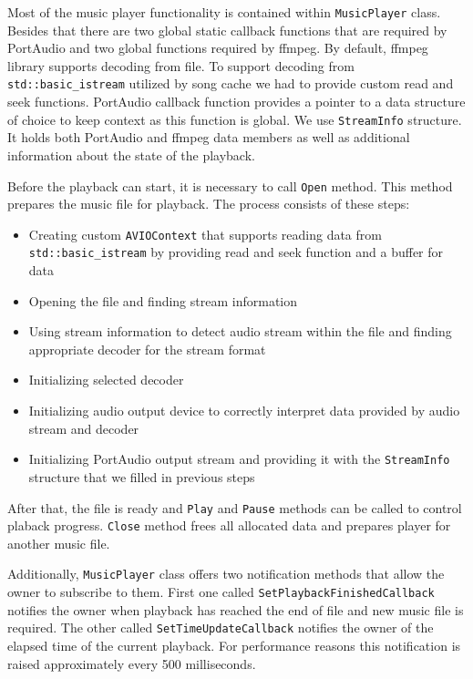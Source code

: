 Most of the music player functionality is contained within \texttt{MusicPlayer} class. Besides that there are two global static callback functions that are required by PortAudio and two global functions required by ffmpeg. By default, ffmpeg library supports decoding from file. To support decoding from \texttt{std::basic\_istream} utilized by song cache we had to provide custom read and seek functions. PortAudio callback function provides a pointer to a data structure of choice to keep context as this function is global. We use \texttt{StreamInfo} structure. It holds both PortAudio and ffmpeg data members as well as additional information about the state of the playback.
\par
Before the playback can start, it is necessary to call \texttt{Open} method. This method prepares the music file for playback. The process consists of these steps:
\begin{itemize}
    \item Creating custom \texttt{AVIOContext} that supports reading data from \texttt{std::basic\_istream} by providing read and seek function and a buffer for data
    \item Opening the file and finding stream information
    \item Using stream information to detect audio stream within the file and finding appropriate decoder for the stream format
    \item Initializing selected decoder 
    \item Initializing audio output device to correctly interpret data provided by audio stream and decoder
    \item Initializing PortAudio output stream and providing it with the \texttt{StreamInfo} structure that we filled in previous steps
\end{itemize}
After that, the file is ready and \texttt{Play} and \texttt{Pause} methods can be called to control plaback progress. \texttt{Close} method frees all allocated data and prepares player for another music file.
\par
Additionally, \texttt{MusicPlayer} class offers two notification methods that allow the owner to subscribe to them. First one called \texttt{SetPlaybackFinishedCallback} notifies the owner when playback has reached the end of file and new music file is required. The other called \texttt{SetTimeUpdateCallback} notifies the owner of the elapsed time of the current playback. For performance reasons this notification is raised approximately every 500 milliseconds.

